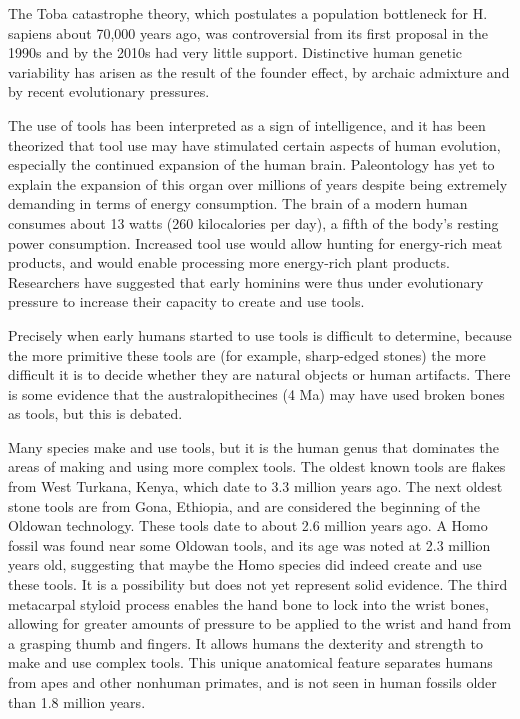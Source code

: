 The Toba catastrophe theory, which postulates a population bottleneck for H. sapiens about 70,000 years ago, was controversial from its first proposal in the 1990s and by the 2010s had very little support. Distinctive human genetic variability has arisen as the result of the founder effect, by archaic admixture and by recent evolutionary pressures.

The use of tools has been interpreted as a sign of intelligence, and it has been theorized that tool use may have stimulated certain aspects of human evolution, especially the continued expansion of the human brain. Paleontology has yet to explain the expansion of this organ over millions of years despite being extremely demanding in terms of energy consumption. The brain of a modern human consumes about 13 watts (260 kilocalories per day), a fifth of the body's resting power consumption. Increased tool use would allow hunting for energy-rich meat products, and would enable processing more energy-rich plant products. Researchers have suggested that early hominins were thus under evolutionary pressure to increase their capacity to create and use tools.

Precisely when early humans started to use tools is difficult to determine, because the more primitive these tools are (for example, sharp-edged stones) the more difficult it is to decide whether they are natural objects or human artifacts. There is some evidence that the australopithecines (4 Ma) may have used broken bones as tools, but this is debated.

Many species make and use tools, but it is the human genus that dominates the areas of making and using more complex tools. The oldest known tools are flakes from West Turkana, Kenya, which date to 3.3 million years ago. The next oldest stone tools are from Gona, Ethiopia, and are considered the beginning of the Oldowan technology. These tools date to about 2.6 million years ago. A Homo fossil was found near some Oldowan tools, and its age was noted at 2.3 million years old, suggesting that maybe the Homo species did indeed create and use these tools. It is a possibility but does not yet represent solid evidence. The third metacarpal styloid process enables the hand bone to lock into the wrist bones, allowing for greater amounts of pressure to be applied to the wrist and hand from a grasping thumb and fingers. It allows humans the dexterity and strength to make and use complex tools. This unique anatomical feature separates humans from apes and other nonhuman primates, and is not seen in human fossils older than 1.8 million years.



